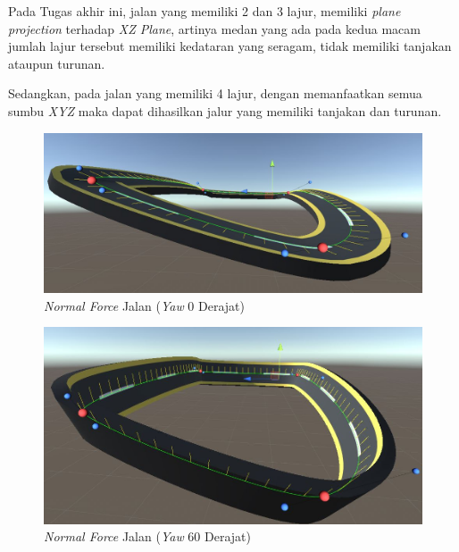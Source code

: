         \par Pada Tugas akhir ini, jalan yang memiliki 2 dan 3 lajur, memiliki \textit{plane projection} terhadap \textit{XZ Plane}, artinya medan yang ada pada kedua macam jumlah lajur tersebut memiliki kedataran yang seragam, tidak memiliki tanjakan ataupun turunan. 
        
        \par Sedangkan, pada jalan yang memiliki 4 lajur, dengan memanfaatkan semua sumbu \textit{XYZ} maka dapat dihasilkan jalur yang memiliki tanjakan dan turunan.
        
        \begin{figure} [!htb]
	        \captionsetup{justification=centering}
	        \includegraphics[scale=0.35]{img/pp1.JPG}
	        \caption{\textit{Normal Force} Jalan (\textit{Yaw} 0 Derajat)}
	        \label{fig: 3_13}
        \end{figure}
        
        \begin{figure} [!htb]
	        \captionsetup{justification=centering}
	        \includegraphics[scale=0.35]{img/pp2.JPG}
	        \caption{\textit{Normal Force} Jalan (\textit{Yaw} 60 Derajat)}
	        \label{fig: 3_14}
        \end{figure}
        
